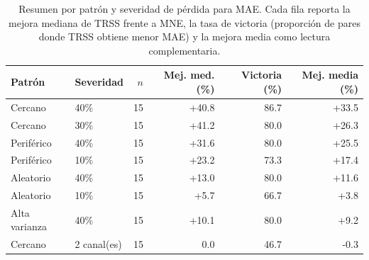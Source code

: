 \begin{table}[htbp]
\centering
\small
\caption{Resumen por patrón y severidad de pérdida para MAE. Cada fila reporta la mejora mediana de TRSS frente a MNE, la tasa de victoria (proporción de pares donde TRSS obtiene menor MAE) y la mejora media como lectura complementaria.}
\label{tab:ch4_scenario_summary_descriptive}
\begin{tabular}{@{}llrrr r@{}}
\toprule
Patrón & Severidad & $n$ & Mej. med. (\%) & Victoria (\%) & Mej. media (\%) \\
\midrule
Cercano & 40\% & 15 & +40.8 & 86.7 & +33.5 \\
Cercano & 30\% & 15 & +41.2 & 80.0 & +26.3 \\
Periférico & 40\% & 15 & +31.6 & 80.0 & +25.5 \\
Periférico & 10\% & 15 & +23.2 & 73.3 & +17.4 \\
Aleatorio & 40\% & 15 & +13.0 & 80.0 & +11.6 \\
Aleatorio & 10\% & 15 & +5.7 & 66.7 & +3.8 \\
Alta varianza & 40\% & 15 & +10.1 & 80.0 & +9.2 \\
Cercano & 2 canal(es) & 15 & 0.0 & 46.7 & -0.3 \\
\bottomrule
\end{tabular}
\end{table}
